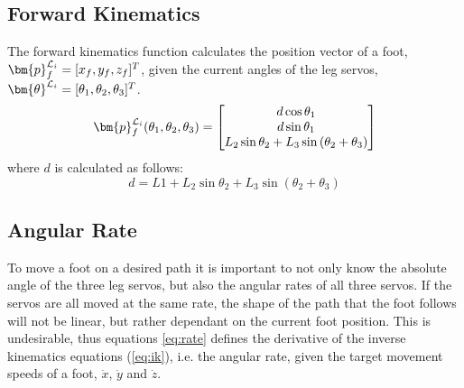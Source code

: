         \subsection{Forward Kinematics}
            The forward kinematics function calculates the position vector of a foot, \(\bm{p}_f\inrefframe{\fleg} = [x_f,y_f,z_f]^T\), given the current angles of the leg servos, \(\bm{\theta}\inrefframe{\fleg} = [\theta_1, \theta_2, \theta_3]^T\).
            \begin{align}
                \bm{p}_f\inrefframe{\fleg}(\theta_1,\theta_2,\theta_3) =
                                \begin{bmatrix}
                                    d\cos{\theta_1}\\
                                    d\sin{\theta_1}\\
                                    L_2\sin{\theta_2} + L_3\sin{\left(\theta_2 + \theta_3\right)}
                                \end{bmatrix}
            \end{align}
            where \(d\) is calculated as follows:
            \begin{equation}\label{eq:dfk}
                d = L1 + L_2\sin{\theta_2} + L_3\sin{(\theta_2 + \theta_3)}
            \end{equation}
        
        \newpage
        \subsection{Angular Rate} \label{sec:ang_rate}
            To move a foot on a desired path it is important to not only know the absolute angle of the three leg servos, but also the angular rates of all three
            servos. If the servos are all moved at the same rate, the shape of the path that the foot follows will not be linear, but rather dependant on the
            current foot position. This is undesirable, thus equations \ref{eq:rate} defines the derivative of the inverse kinematics equations (\ref{eq:ik}), i.e. the angular
            rate, given the target movement speeds of a foot, \(\dot{x}\), \(\dot{y}\) and \(\dot{z}\).

